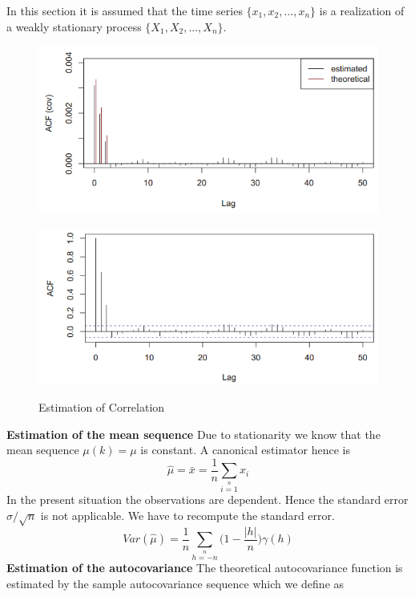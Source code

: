 {
In this section it is assumed that the time series $\{x_1,x_2,...,x_n\}$ is a realization of a weakly stationary process $\{X_1,X_2,...,X_n\}$.
\begin{figure}[H]\centering
	\begin{minipage}[c]{0.5\textwidth}
		\includegraphics[width=1\linewidth]{images/tsCov.png}
		\label{Fig:tsSamAutoCov}
	\end{minipage}\hfill
	\begin{minipage}[c]{0.5\textwidth}
		\includegraphics[width=1\linewidth]{images/tsACF.png}
		\label{Fig:tsSamAutoCor}
	\end{minipage}
	\caption{Estimation of Correlation}
\end{figure}
\RTheory
{\textbf{Estimation of the mean sequence}\vfill
Due to stationarity we know that the mean sequence $\mu(k)=\mu$ is constant. A canonical estimator hence is 
$$\hat{\mu}=\bar{x}=\frac{1}{n}\sum\limits_{i=1}\limits^{n}x_i$$
In the present situation the observations are dependent. Hence the standard error $\sigma/\sqrt{n}$ is not applicable. We have to recompute the standard error.
$$Var(\hat{\mu})=\frac{1}{n}\sum\limits_{h=-n}\limits^{n}\bigg(1- \frac{|h|}{n}\bigg)\gamma(h) $$
\vfill
\hfill
\break
\textbf{Estimation of the autocovariance}\vfill
The theoretical autocovariance function is estimated by the sample autocovariance sequence which we define as

}}
